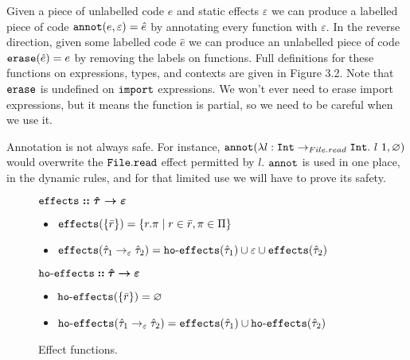 \noindent
Given a piece of unlabelled code $e$ and static effects $\varepsilon$ we can produce a labelled piece of code $\mathtt{annot}(e, \varepsilon) = \hat e$ by annotating every function with $\varepsilon$. In the reverse direction, given some labelled code $\hat e$ we can produce an unlabelled piece of code $\mathtt{erase}(\hat e) = e$ by removing the labels on functions. Full definitions for these functions on expressions, types, and contexts are given in Figure 3.2. Note that $\mathtt{erase}$ is undefined on $\mathtt{import}$ expressions. We won't ever need to erase import expressions, but it means the function is partial, so we need to be careful when we use it.

Annotation is not always safe. For instance, $\mathtt{annot}(\lambda l: \mathtt{Int} \rightarrow_{File.read} \mathtt{Int} . ~l~1, \varnothing)$ would overwrite the $\mathtt{File.read}$ effect permitted by $l$. $\mathtt{annot}$ is used in one place, in the dynamic rules, and for that limited use we will have to prove its safety. \\




















\begin{figure}[h]

$\bm{\mathtt{effects :: \hat \tau \rightarrow \varepsilon}}$ \begin{itemize}
	\setlength\itemsep{-0.7em}
	\item[] $\mathtt{effects}(\{ \bar r \}) = \{ r.\pi \mid r \in \bar r, \pi \in \Pi \}$
	\item[] $\mathtt{effects}(\hat \tau_1 \rightarrow_{\varepsilon} \hat \tau_2) = \mathtt{ho \hbox{-} effects}(\hat \tau_1) \cup \varepsilon \cup \mathtt{effects}(\hat \tau_2)$
\end{itemize}

$\bm{\mathtt{ho \hbox{-} effects} :: \hat \tau \rightarrow \varepsilon}$ \begin{itemize}
	\setlength\itemsep{-0.7em}
	\item[] $\mathtt{ho \hbox{-} effects}(\{ \bar r \}) = \varnothing$
	\item[] $\mathtt{ho \hbox{-} effects}(\hat \tau_1 \rightarrow_{\varepsilon} \hat \tau_2) = \mathtt{effects}(\hat \tau_1) \cup \mathtt{ho \hbox{-} effects}(\hat \tau_2)$
\end{itemize}

\vspace{-7pt}
\caption{Effect functions.}
\label{This is the label.}
\end{figure}

